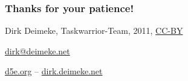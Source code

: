 \documentclass[t,handout]{beamer}
\begin{document}
\begin{frame}
\frametitle{Thanks for your patience!}
\begin{center}
Dirk Deimeke, Taskwarrior-Team, 2011, \href{https://creativecommons.org/licenses/by/3.0/}{CC-BY}

\href{mailto:dirk@deimeke.net}{dirk@deimeke.net}

\href{http://d5e.org/}{d5e.org} -- \href{http://dirk.deimeke.net/}{dirk.deimeke.net}
\end{center}
\end{frame}
\end{document}
